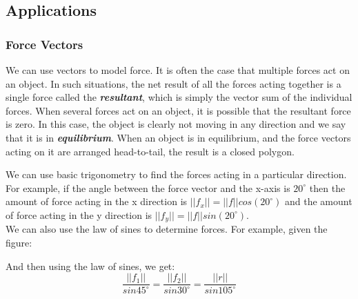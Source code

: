 \documentclass{article}
\newcommand{\tib}[1]{\textbf{\textit{#1}}} %
\begin{document}
	\subsection{Applications}
		\subsubsection{Force Vectors}
		We can use vectors to model force. It is often the case that multiple forces act on an object. 
		In such situations, the net result of all the forces acting together is a single force called the 
		\tib{resultant}, which is simply the vector sum of the individual forces. When 
		several forces act on an object, it is possible that the resultant force is zero. In this case, the 
		object is clearly not moving in any direction and we say that it is in
		\tib{equilibrium}. When an object is in equilibrium, and the force vectors acting on 
		it are arranged head-to-tail, the result is a closed polygon.
		\iffalse %
		\begin{figure}[htbp]
			\centering
			\texttt{[image: resultant\_forces.jpg]} 
			\caption{The resultant of two forces}
			\label{fig:resultant_forces}
		\end{figure}
		
		\begin{figure}[htbp]
			\centering
			\texttt{[image: equilibrium\_forces.jpg]} 
			\caption{Forces in equilibrium}
			\label{fig:equilibrium_forces}
		\end{figure}
		\fi
		
		We can use basic trigonometry to find the forces acting in a particular direction. For 
		example, if the angle between the force vector and the x-axis is $20^{\circ}$ then the 
		amount of force acting in the x direction is $||f_x|| = ||f||cos(20^{\circ})$ and the amount of 
		force acting in the y direction is $||f_y|| = ||f||sin(20^{\circ})$. \\
		
		We can also use the law of sines to determine forces. For example, given the figure:
		\iffalse%
		\begin{figure}[htbp]
			\centering
			\texttt{[image: law\_of\_sines.jpg]} 
			\caption{Law of sines example}
			\label{fig:law_of_sines}
		\end{figure}
		\fi
		And then using the law of sines, we get:
		\[ \frac{||f_1||}{sin45^{\circ}} = \frac{||f_2||}{sin30^{\circ}} = \frac{||r||}{sin105^{\circ}} \]
		
\end{document}
